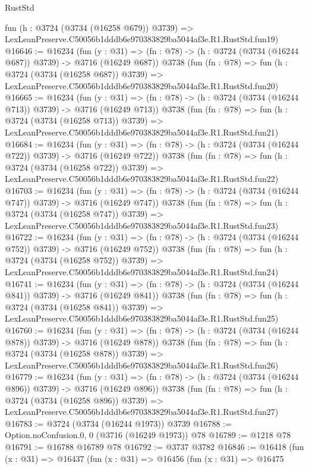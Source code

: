 \begin{lexlean}{RustStd}
\begin{coremodule}
    fun (h : @3724 (@3734 (@16258 @679)) @3739) =>
    LexLeanPreserve.C50056b1dddb6e970383829ba5044af3e.R1.RustStd.fun19)
@16646 := @16234
    (fun (y : @31) => (fn : @78) -> (h : @3724 (@3734 (@16244 @687)) @3739) -> @3716 (@16249 @687))
    @3738
    (fun (fn : @78) =>
    fun (h : @3724 (@3734 (@16258 @687)) @3739) =>
    LexLeanPreserve.C50056b1dddb6e970383829ba5044af3e.R1.RustStd.fun20)
@16665 := @16234
    (fun (y : @31) => (fn : @78) -> (h : @3724 (@3734 (@16244 @713)) @3739) -> @3716 (@16249 @713))
    @3738
    (fun (fn : @78) =>
    fun (h : @3724 (@3734 (@16258 @713)) @3739) =>
    LexLeanPreserve.C50056b1dddb6e970383829ba5044af3e.R1.RustStd.fun21)
@16684 := @16234
    (fun (y : @31) => (fn : @78) -> (h : @3724 (@3734 (@16244 @722)) @3739) -> @3716 (@16249 @722))
    @3738
    (fun (fn : @78) =>
    fun (h : @3724 (@3734 (@16258 @722)) @3739) =>
    LexLeanPreserve.C50056b1dddb6e970383829ba5044af3e.R1.RustStd.fun22)
@16703 := @16234
    (fun (y : @31) => (fn : @78) -> (h : @3724 (@3734 (@16244 @747)) @3739) -> @3716 (@16249 @747))
    @3738
    (fun (fn : @78) =>
    fun (h : @3724 (@3734 (@16258 @747)) @3739) =>
    LexLeanPreserve.C50056b1dddb6e970383829ba5044af3e.R1.RustStd.fun23)
@16722 := @16234
    (fun (y : @31) => (fn : @78) -> (h : @3724 (@3734 (@16244 @752)) @3739) -> @3716 (@16249 @752))
    @3738
    (fun (fn : @78) =>
    fun (h : @3724 (@3734 (@16258 @752)) @3739) =>
    LexLeanPreserve.C50056b1dddb6e970383829ba5044af3e.R1.RustStd.fun24)
@16741 := @16234
    (fun (y : @31) => (fn : @78) -> (h : @3724 (@3734 (@16244 @841)) @3739) -> @3716 (@16249 @841))
    @3738
    (fun (fn : @78) =>
    fun (h : @3724 (@3734 (@16258 @841)) @3739) =>
    LexLeanPreserve.C50056b1dddb6e970383829ba5044af3e.R1.RustStd.fun25)
@16760 := @16234
    (fun (y : @31) => (fn : @78) -> (h : @3724 (@3734 (@16244 @878)) @3739) -> @3716 (@16249 @878))
    @3738
    (fun (fn : @78) =>
    fun (h : @3724 (@3734 (@16258 @878)) @3739) =>
    LexLeanPreserve.C50056b1dddb6e970383829ba5044af3e.R1.RustStd.fun26)
@16779 := @16234
    (fun (y : @31) => (fn : @78) -> (h : @3724 (@3734 (@16244 @896)) @3739) -> @3716 (@16249 @896))
    @3738
    (fun (fn : @78) =>
    fun (h : @3724 (@3734 (@16258 @896)) @3739) =>
    LexLeanPreserve.C50056b1dddb6e970383829ba5044af3e.R1.RustStd.fun27)
@16783 := @3724 (@3734 (@16244 @1973)) @3739
@16788 := Option.noConfusion.{0, 0} (@3716 (@16249 @1973)) @78
@16789 := @1218 @78
@16791 := @16788 @16789 @78
@16792 := @3737 @3782
@16846 := @16418
    (fun (x : @31) =>
    @16437
      (fun (x : @31) =>
      @16456
        (fun (x : @31) =>
        @16475

\end{coremodule}
\end{lexlean}
